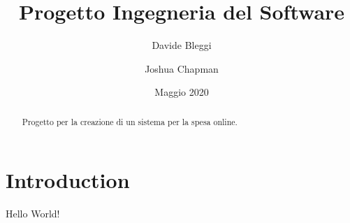 \documentclass[12pt, a4paper]{article}
\title{Progetto Ingegneria del Software}
\author{
  Davide Bleggi
  \and
  Joshua Chapman
}
\date{Maggio 2020}
\begin{document}
\begin{titlepage}
  \maketitle
\end{titlepage}

\begin{abstract}
  Progetto per la creazione di un sistema per la spesa online.
\end{abstract}

\section{Introduction}
Hello World!
\end{document}
